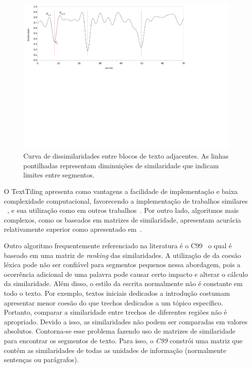    
\begin{figure}[h!]
\center
	\includegraphics[trim={ 10 320 180 0 },clip,page=1,width=\textwidth]{conteudo/capitulos/figs/curva-similaridade.pdf}

	\caption{Curva de dissimilaridades entre blocos de texto adjacentes. As linhas pontilhadas representam diminuições de similaridade que indicam limites entre segmentos.}
	\label{fig:curvasimilaridade}
\end{figure}



O TextTiling apresenta como vantagens a facilidade de implementação e baixa complexidade computacional, favorecendo a implementação de trabalhos similares ~\cite{Naili2016,Bokaei2015,CHAIBI2014,Kern2009,Galley2003}, e sua utilização como  em outros trabalhos~\cite{Cardoso2017,Dias2007}. Por outro lado, algoritmos mais complexos, como os baseados em matrizes de similaridade, apresentam acurácia relativamente superior como apresentado em~\cite{Choi2000, Kern2009, Misra2009}.



Outro algoritmo frequentemente referenciado na literatura é o C99~\cite{Choi2000} o qual é baseado em uma matriz de \textit{ranking} das similaridades. A utilização de da coesão léxica pode não ser confiável para segmentos pequenos nessa abordagem, pois a ocorrência adicional de uma palavra pode causar certo impacto e alterar o cálculo da similaridade. Além disso, o estilo da escrita normalmente não é constante em todo o texto. Por exemplo, textos iniciais dedicados a introdução costumam apresentar menor coesão do que trechos dedicados a um tópico específico. Portanto, comparar a similaridade entre trechos de diferentes regiões não é apropriado. Devido a isso, as similaridades não podem ser comparadas em valores absolutos. Contorna-se esse problema fazendo uso de matrizes de similaridade para encontrar os segmentos de texto. Para isso, o \textit{C99} constrói uma matriz que contém as similaridades de todas as unidades de informação (normalmente sentenças ou parágrafos). 

